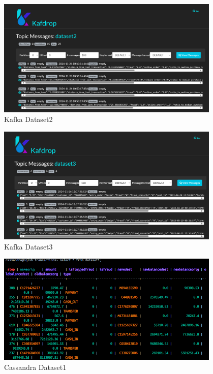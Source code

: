 \documentclass[12pt,a4paper, hidelinks]{article}
\begin{document}
\begin{figure}[htbp]
  \centering
  \includegraphics[width=0.95\textwidth]{images/m2-kafka-2.png}
  \caption{Kafka Dataset2}
  \label{fig:kafka2}
\end{figure}

\begin{figure}[htbp]
  \centering
  \includegraphics[width=0.95\textwidth]{images/m2-kafka-3.png}
  \caption{Kafka Dataset3}
  \label{fig:kafka3}
\end{figure}


\begin{figure}[htbp]
  \centering
  \includegraphics[width=0.95\textwidth]{images/m2-dataset-1.png}
  \caption{Cassandra Dataset1}
  \label{fig:cassandra1}
\end{figure}
\end{document}
